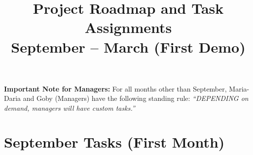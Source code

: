 \documentclass[11pt,a4paper]{article}
\title{\textbf{Project Roadmap and Task Assignments} \\ \large September -- March (First Demo)}
\author{}
\date{}
\begin{document}
\maketitle

\begin{tcolorbox}[colback=blue!5!white,colframe=blue!75!black,title=General Instructions]
\textbf{Important Note for Managers:} For all months other than September, Maria-Daria and Goby (Managers) have the following standing rule: \textit{``DEPENDING on demand, managers will have custom tasks.''}
\end{tcolorbox}

\section*{September Tasks (First Month)}
\end{document}
